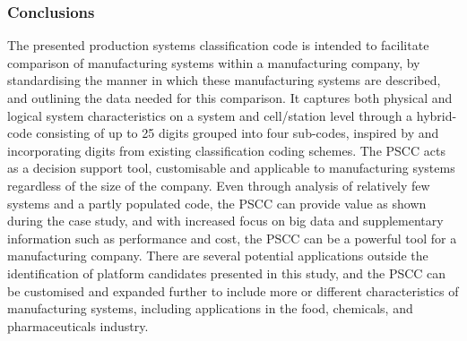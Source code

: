 \subsubsection*{Conclusions}
The presented production systems classification code is intended to facilitate comparison of manufacturing systems within a manufacturing company, by standardising the manner in which these manufacturing systems are described, and outlining the data needed for this comparison.
It captures both physical and logical system characteristics on a system and cell/station level through a hybrid-code consisting of up to 25 digits grouped into four sub-codes, inspired by and incorporating digits from existing classification coding schemes.
The PSCC acts as a decision support tool, customisable and applicable to manufacturing systems regardless of the size of the company.
Even through analysis of relatively few systems and a partly populated code, the PSCC can provide value as shown during the case study, and with increased focus on big data and supplementary information such as performance and cost, the PSCC can be a powerful tool for a manufacturing company.
There are several potential applications outside the identification of platform candidates presented in this study, and the PSCC can be customised and expanded further to include more or different characteristics of manufacturing systems, including applications in the food, chemicals, and pharmaceuticals industry.

